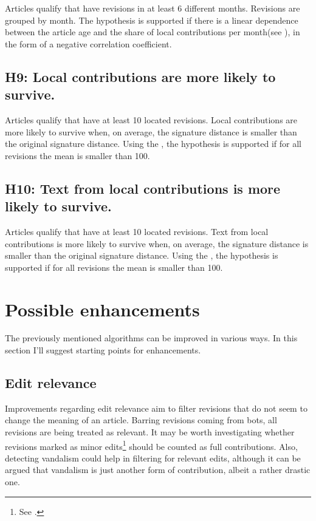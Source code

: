 Articles qualify that have revisions in at least 6 different months.
Revisions are grouped by month.
The hypothesis is supported if there is a linear dependence between the article age and the share of local contributions per month(see ), in the form of a negative correlation coefficient.

\subsection*{H9: Local contributions are more likely to survive.}

Articles qualify that have at least 10 located revisions.
Local contributions are more likely to survive when, on average, the  signature distance is smaller than the original signature distance.
Using the , the hypothesis is supported if for all revisions the mean  is smaller than 100.

\subsection*{H10: Text from local contributions is more likely to survive.}

Articles qualify that have at least 10 located revisions.
Text from local contributions is more likely to survive when, on average, the  signature distance is smaller than the original signature distance.
Using the , the hypothesis is supported if for all revisions the mean  is smaller than 100.


\section{Possible enhancements}\label{sec:enhancements}

The previously mentioned algorithms can be improved in various ways.
In this section I'll suggest starting points for enhancements.

\subsection{Edit relevance}

Improvements regarding edit relevance aim to filter revisions that do not seem to change the meaning of an article.
Barring revisions coming from bots, all revisions are being treated as relevant.
It may be worth investigating whether revisions marked as minor edits\footnote{See .} should be counted as full contributions.
Also, detecting vandalism could help in filtering for relevant edits, although it can be argued that vandalism is just another form of contribution, albeit a rather drastic one.

